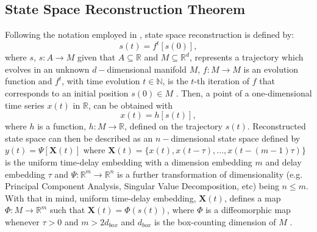 \documentclass[fleqn,10pt]{wlscirep}
\begin{document}
\subsection*{State Space Reconstruction Theorem}
Following the notation employed in \cite{casdagli1991, garland2016, gibson1992, uzal2011, uzal2010, takens1981}, state space reconstruction is defined by:
\begin{equation}\label{eq:ssr}
  s(t)=f^t [s(0)],
\end{equation}
where $s$, $s: A \rightarrow M$ given that $A \subseteq \mathbb{R}$ and $M \subseteq \mathbb{R}^d$, represents a trajectory which evolves in an unknown $d-$dimensional manifold $M$, $f: M \rightarrow M$ is an evolution function and $f^t$, with time evolution $t \in \mathbb{N}$, is the $t$-th iteration of $f$ that corresponds to an initial position $s(0) \in M $ \cite{takens1981}.
Then, a point of a one-dimensional time series $x(t)$ in $\mathbb{R}$, can be obtained with
\begin{equation}\label{eq:measurement}
  x(t)=h[s(t)],
\end{equation}
where $h$ is a function, $h: M \rightarrow \mathbb{R}$, defined on the trajectory $s(t)$.
Reconstructed state space can then be described as an $n-$dimensional state space defined by $y(t)=\Psi[\boldsymbol{X}(t)]$ where $\boldsymbol{X}(t) = \{ x(t), x(t-\tau) , ...,x(t - (m-1)\tau  ) \}$ is the uniform time-delay embedding with a dimension embedding $m$ and delay embedding $\tau$ and $ \Psi: \mathbb{R}^m \rightarrow \mathbb{R}^n$ is a further transformation of dimensionality (e.g. Principal Component Analysis,
Singular Value Decomposition, etc) being $n \leq m$.
With that in mind, uniform time-delay embedding, $\boldsymbol{X}(t)$, defines a map $\Phi: M \rightarrow \mathbb{R}^m$ such that $\boldsymbol{X}(t) = \Phi(s(t))$, where $\Phi$ is a diffeomorphic map \cite{takens1981} whenever $\tau > 0$ and $m > 2d_{box}$ and $d_{box}$ is the box-counting dimension of $M$ \cite{garland2016}.
\end{document}

